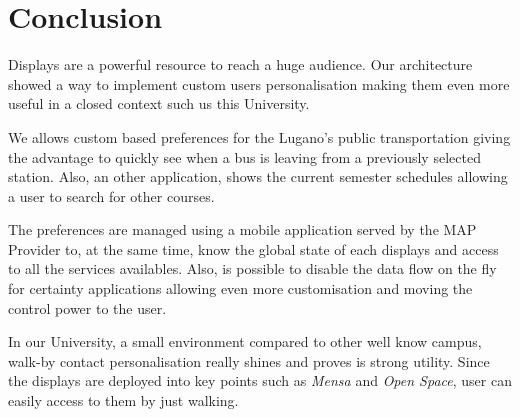 \documentclass[]{usiinfbachelorproject}
\begin{document}
\section{Conclusion}
Displays are a powerful resource to reach a huge audience. Our architecture showed a way to implement custom users personalisation making them even more useful in a closed context such us this University. 

We allows custom based preferences for the Lugano's public transportation giving the advantage to quickly see when a bus is leaving from a previously selected station. Also, an other application, shows the current semester schedules allowing a user to search for other courses.

The preferences are managed using a mobile application served by the MAP Provider to, at the same time, know the global state of each displays and access to all the services availables. Also, is possible to disable the data flow on the fly for certainty applications allowing even more customisation and moving the control power to the user.

In our University, a small environment compared to other well know campus, walk-by contact personalisation really shines and proves is strong utility. Since the displays are deployed into key points such as \emph{Mensa} and \emph{Open Space}, user can easily access to them by just walking.

\newpage


\end{document}
